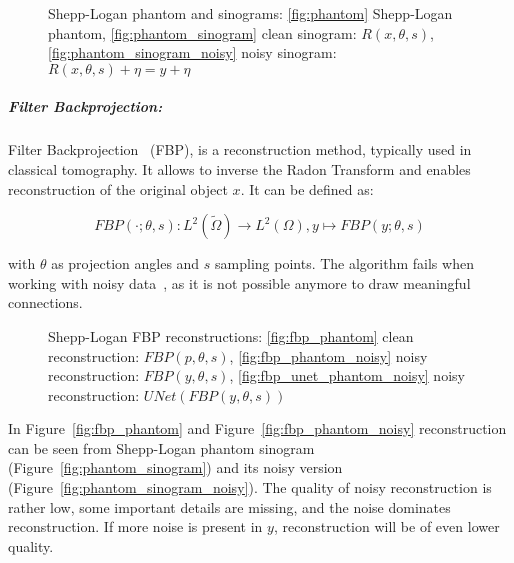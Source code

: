 \begin{figure}[H]
    \label{fig:phantom_and_sinos}
    \hfill
    \hfill
    \hfill
    \hfill
	\caption{Shepp-Logan phantom and sinograms:
    \ref{fig:phantom} Shepp-Logan phantom,
    \ref{fig:phantom_sinogram} clean sinogram: $R(x, \theta, s)$,
    \ref{fig:phantom_sinogram_noisy} noisy sinogram: $R(x, \theta, s) + \eta = y + \eta$ 
    }
\end{figure}

\subparagraph{Filter Backprojection:}
Filter Backprojection~\cite{tomographicReconstruction} (FBP), 
is a reconstruction method, typically used in classical tomography.
It allows to inverse the Radon Transform and enables reconstruction of the original object $x$.
It can be defined as:

\begin{equation}
    \label{eq:fbp}
    \textit{FBP}(\cdot; \theta, s) : L^2(\tilde{\Omega}) \to L^2(\Omega), y \mapsto \textit{FBP}(y; \theta, s)
\end{equation}

with $\theta$ as projection angles and $s$ sampling points. 
The algorithm fails when working with noisy data~\cite{cryoEmMath2}, as it is not possible anymore to draw meaningful connections.

\begin{figure}[h]
    \label{fig:phantom_fbps}
    \hfill
    \hfill
    \hfill
    \hfill
	\caption{Shepp-Logan FBP reconstructions:
    \ref{fig:fbp_phantom} clean reconstruction: $\textit{FBP}(p, \theta, s)$,
    \ref{fig:fbp_phantom_noisy} noisy reconstruction: $\textit{FBP}(y, \theta, s)$,
    \ref{fig:fbp_unet_phantom_noisy} noisy reconstruction: $\textit{UNet}(\textit{FBP}(y, \theta, s))$ 
    }
\end{figure}

In Figure~\ref{fig:fbp_phantom} and Figure~\ref{fig:fbp_phantom_noisy} reconstruction can be seen from 
Shepp-Logan phantom sinogram (Figure~\ref{fig:phantom_sinogram}) and its noisy version (Figure~\ref{fig:phantom_sinogram_noisy}).
The quality of noisy reconstruction is rather low, some important details are missing, and the noise dominates reconstruction.
If more noise is present in $y$, reconstruction will be of even lower quality.

